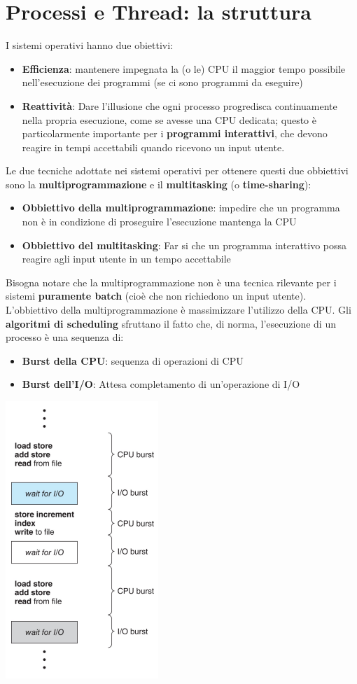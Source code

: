 \documentclass[12pt]{article}
\begin{document}
\section{Processi e Thread: la struttura}
I sistemi operativi hanno due obiettivi:
\begin{itemize}
    \item \textbf{Efficienza}: mantenere impegnata la (o le) CPU il maggior tempo possibile nell'esecuzione dei programmi (se ci sono programmi da eseguire)
    \item \textbf{Reattività}: Dare l'illusione che ogni processo progredisca continuamente nella propria esecuzione, come se avesse una CPU dedicata; questo è particolarmente importante per i \textbf{programmi interattivi}, che devono reagire in tempi accettabili quando ricevono un input utente.
\end{itemize}
Le due tecniche adottate nei sistemi operativi per ottenere questi due obbiettivi sono la \textbf{multiprogrammazione} e il \textbf{multitasking} (o \textbf{time-sharing}):
\begin{itemize}
    \item \textbf{Obbiettivo della multiprogrammazione}: impedire che un programma non è in condizione di proseguire l'esecuzione mantenga la CPU
    \item \textbf{Obbiettivo del multitasking}: Far si che un programma interattivo possa reagire agli input utente in un tempo accettabile
\end{itemize}
Bisogna notare che la multiprogrammazione non è una tecnica rilevante per i sistemi \textbf{puramente batch} (cioè che non richiedono un input utente).
L'obbiettivo della multiprogrammazione è massimizzare l'utilizzo della CPU. Gli \textbf{algoritmi di scheduling} sfruttano il fatto che, di norma, l'esecuzione di un processo è una sequenza di:
\begin{itemize}
    \item \textbf{Burst della CPU}: sequenza di operazioni di CPU
    \item \textbf{Burst dell'I/O}: Attesa completamento di un'operazione di I/O
\end{itemize}
\begin{center}
    \includegraphics[width = 0.28\linewidth]{Images/36.png}
\end{center}
\end{document}
